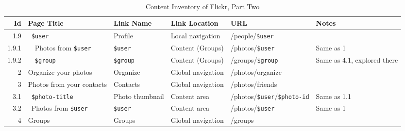 \documentclass[12pt,a4paper]{article}
\newcommand{\var}[1]{\texttt{\${#1}}}
\begin{document}
%
%

\begin{landscape}
  \begin{table}[h!b!p!]
    \caption{Content Inventory of Flickr, Part Two}
    \label{table:flickr.content.inventory.2}
    \begin{center}
      \begin{tiny}
        \tt
        \begin{tabular}{r|l|l|l|l|p{3cm}}
            Id &
            Page Title &
            Link Name &
            Link Location &
            URL &
            Notes \\

            \hline

              1.9 &
              ~\var{user} &
              Profile &
              Local navigation &
              /people/\var{user} &
              \\

                1.9.1 &
                ~~Photos from \var{user} &
                \var{user} &
                Content (Groups) &
                /photos/\var{user} &
                Same as 1 \\

                1.9.2 &
                ~~\var{group} &
                \var{group} &
                Content (Groups) &
                /groups/\var{group} &
                Same as 4.1, explored there \\

            2 &
            Organize your photos &
            Organize &
            Global navigation &
            /photos/organize &
            \\

            3 &
            Photos from your contacts &
            Contacts &
            Global navigation &
            /photos/friends &
            \\

              3.1 &
              ~\var{photo-title} &
              Photo thumbnail &
              Content area &
              /photos/\var{user}/\var{photo-id} &
              Same as 1.1 \\

              3.2 &
              ~Photos from \var{user} &
              \var{user} &
              Content area &
              /photos/\var{user} &
              Same as 1 \\

            4 &
            Groups &
            Groups &
            Global navigation &
            /groups &
            \\


\end{tabular}
\end{tiny}
\end{center}
\end{table}
\end{landscape}
\end{document}
